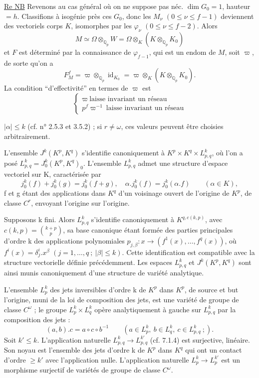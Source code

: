 \uline{Re NB} Revenons au cas général où on ne suppose pas néc. $\dim G_0=1$,   hauteur $=h$. Classifions à isogénie près  ces $G_0$, donc les $M_\nu$ $(0\leq\nu\leq f-1)$ deviennent des vectoriels  corps $K$, isomorphes par les $\varphi_\nu$ $(0\leq\nu\leq f-2)$. Alors
\[
M\simeq\Omega\otimes_{\mathbb Q_p}W=\Omega\otimes_K(K\otimes_{\mathbb Q_p}K_0)
\]
et $F$ est déterminé par la connaissance de $\varphi_{f-1}$, qui est un endom de $M$, soit $\varpi$, de sorte qu'on a
\[
F_M^f=\varpi\otimes_{\mathbb Q_p}\operatorname{id}_{K_0}=\varpi\otimes_K(K\otimes_{\mathbb Q_p}K_0).
\]
La condition ``d'effectivité'' en termes de $\varpi$ est
\[
\left\{\begin{array}{l}
\varpi\ \text{laisse invariant un réseau}\\
p^f\varpi^{-1}\ \text{laisse invariant un réseau}
\end{array}\right.
\]

$|\alpha|\leq k$ (cf. n° 2.5.3 et 3.5.2) ; si $r\ne\omega$, ces valeurs peuvent être choisies arbitrairement.

L'ensemble $J^k(K^p,K^q)$ s'identifie canoniquement à $K^p\times K^q\times L_{p,q}^k$, où l'on a posé $L_{p,q}^k=J_0^k(K^p,K^q)_0$. L'ensemble $L_{p,q}^k$ admet une structure d'espace vectoriel sur K, caractérisée par
\[
j_0^k(f)+j_0^k(g)=j_0^k(f+g),\quad\alpha.j_0^k(f)=j_0^k(\alpha.f)\qquad(\alpha\in K),
\]
f et g étant des applications dans $K^q$ d'un voisinage ouvert de l'origine de $K^p$, de classe $C^r$, envoyant l'origine sur l'origine.

Supposons k fini. Alors $L_{p,q}^k$ s'identifie canoniquement à $K^{q,c(k,p)}$, avec $c(k,p)=\binom{k+p}{p}$, sa base canonique étant formée des parties principales d'ordre k des applications polynomiales $p_{j,\beta}:x\longrightarrow(f^1(x),\ldots,f^q(x))$, où $f^i(x)=\delta_j^i.x^\beta$ $(j=1,\ldots,q\ ;\ |\beta|\leq k)$. Cette identification est compatible avec la structure vectorielle définie précédemment. Les espaces $L_{p,q}^k$ et $J^k(K^p,K^q)$ sont ainsi munis canoniquement d'une structure de variété analytique.

L'ensemble $L_p^k$ des jets inversibles d'ordre k de $K^p$ dans $K^p$, de source et but l'origine, muni de la loi de composition des jets, est une variété de groupe de classe $C^\omega$ ; le groupe $L_p^k\times L_q^k$ opère analytiquement à gauche sur $L_{p,q}^k$ par la composition des jets :
\[
(a,b).c=a\circ c\circ b^{-1}\qquad(a\in L_p^k,\ b\in L_q^k,\ c\in L_{p,q}^k\ ;).
\]
Soit $k'\leq k$. L'application naturelle $L_{p,q}^k\longrightarrow L_{p,q}^{k'}$ (cf. 7.1.4) est surjective, linéaire. Son noyau est l'ensemble des jets d'ordre k de $K^p$ dans $K^q$ qui ont un contact d'ordre $\geq k'$ avec l'application nulle. L'application naturelle $L_p^k\longrightarrow L_p^{k'}$ est un morphisme surjectif de variétés de groupe de classe $C^\omega$.

